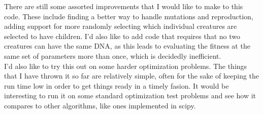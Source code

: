 \documentclass[twocolumn]{aastex63}
\begin{document}

There are still some assorted improvements that I would like to make to this code. These include finding a better way to handle mutations and reproduction, adding support for more randomly selecting which individual creatures are selected to have children. I'd also like to add code that requires that no two creatures can have the same DNA, as this leads to evaluating the fitness at the same set of parameters more than once, which is decidedly inefficient.\\

I'd also like to try this out on some harder optimization problems. The things that I have thrown it so far are relatively simple, often for the sake of keeping the run time low in order to get things ready in a timely fasion. It would be interesting to run it on some standard optimization test problems and see how it compares to other algorithms, like ones implemented in scipy.\\








\begin{comment}
\begin{figure}[H]
  \begin{center}
  \texttt{[image: Test.pdf]}
  \caption{This figure shows the results of an algorithm test at 4 different generations. Blue dots represent old creatures, red x's mark new child creatures, and the green star at (0 , 0) shows the right answer.} \label{test}
  \end{center}
\end{figure}

\begin{figure}[H]
  \begin{center}
  \texttt{[image: Lcurve.pdf]}
  \caption{This figure shows the lightcurve from our star. This lightcurve was produced through many observations of the kepler satellite.} \label{lcurve}
  \end{center}
\end{figure}

\begin{figure}[H]
  \begin{center}
  \texttt{[image: Periodogram.pdf]}
  \caption{This figure shows a periodogram of our light curve. The spikes correspond to different modes of oscillation inside of our star.} \label{periodogram}
  \end{center}
\end{figure}
\end{comment}

\pagebreak




\end{document}
